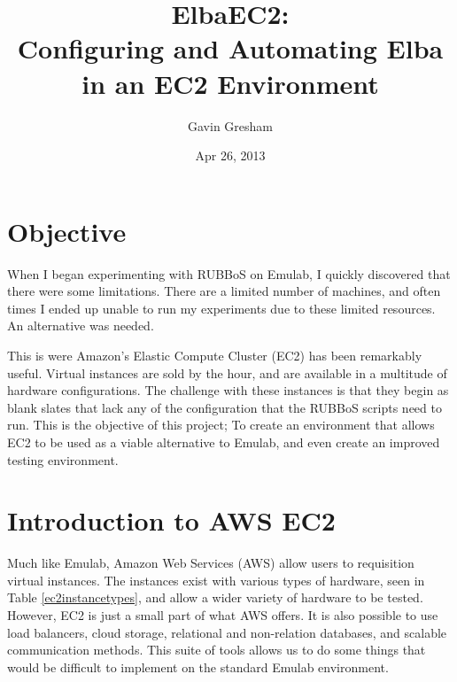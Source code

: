 \documentclass{article}
\begin{document}
\title{ElbaEC2:\\Configuring and Automating Elba in an EC2 Environment}
\author{Gavin Gresham}
\date{Apr 26, 2013}
\maketitle

\tableofcontents
\pagebreak

\section{Objective}
When I began experimenting with RUBBoS on Emulab, I quickly discovered that there were some limitations. There are a limited number of machines, and often times I ended up unable to run my experiments due to these limited resources. An alternative was needed.

This is were Amazon's Elastic Compute Cluster (EC2) has been remarkably useful. Virtual instances are sold by the hour, and are available in a multitude of hardware configurations. The challenge with these instances is that they begin as blank slates that lack any of the configuration that the RUBBoS scripts need to run. This is the objective of this project; To create an environment that allows EC2 to be used as a viable alternative to Emulab, and even create an improved testing environment.
\section{Introduction to AWS EC2}
Much like Emulab, Amazon Web Services (AWS) allow users to requisition virtual instances. The instances exist with various types of hardware, seen in Table \ref{ec2instancetypes}, and allow a wider variety of hardware to be tested. However, EC2 is just a small part of what AWS offers. It is also possible to use load balancers, cloud storage, relational and non-relation databases, and scalable communication methods. This suite of tools allows us to do some things that would be difficult to implement on the standard Emulab environment.
\end{document}
